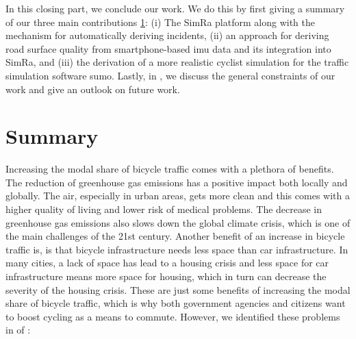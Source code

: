 \vspace*{\fill}
In this closing part, we conclude our work.
We do this by first giving a summary of our three main contributions \ref{cha:summary}: (i) The SimRa platform along with the mechanism for automatically deriving incidents, (ii) an approach for deriving road surface quality from smartphone-based \ac{imu} data and its integration into SimRa, and (iii) the derivation of a more realistic cyclist simulation for the traffic simulation software \ac{sumo}.
Lastly, in , we discuss the general constraints of our work and give an outlook on future work.
\vspace*{\fill}
\chapter{Summary}
\label{cha:summary}
Increasing the modal share of bicycle traffic comes with a plethora of benefits.
The reduction of greenhouse gas emissions has a positive impact both locally and globally.
The air, especially in urban areas, gets more clean and this comes with a higher quality of living and lower risk of medical problems.
The decrease in greenhouse gas emissions also slows down the global climate crisis, which is one of the main challenges of the 21st century.
Another benefit of an increase in bicycle traffic is, is that bicycle infrastructure needs less space than car infrastructure.
In many cities, a lack of space has lead to a housing crisis and less space for car infrastructure means more space for housing, which in turn can decrease the severity of the housing crisis.
These are just some benefits of increasing the modal share of bicycle traffic, which is why both government agencies and citizens want to boost cycling as a means to commute.
However, we identified these problems in  of :

